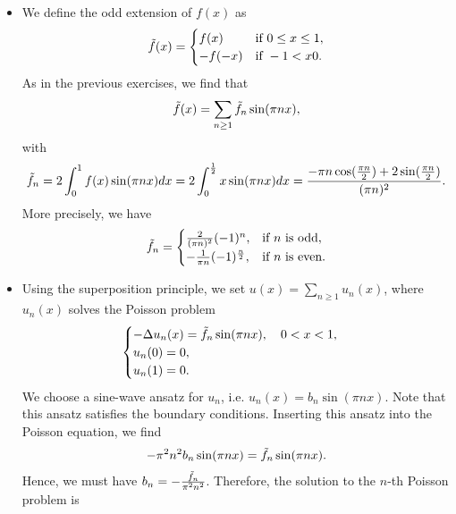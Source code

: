 \documentclass[11pt]{article}
\begin{document}
\begin{solution}
\begin{itemize}
    \item We define the odd extension of $f(x)$ as
    \begin{align*}
        \Tilde{f}(x) = \begin{cases}
            f(x) & \text{if } 0 \leq x \leq 1,\\
            -f(-x) & \text{if } -1 < x 0.
        \end{cases}
    \end{align*}
    As in the previous exercises, we find that
    \begin{align*}
        \Tilde{f}(x) = \sum_{n \geq 1} \Tilde{f}_n \sin(\pi n x), 
    \end{align*}
    with
    \begin{align*}
        \Tilde{f}_n = 2 \int_0^1 f(x) \sin(\pi n x) dx = 2 \int_0^{\frac 1 2} x \sin(\pi n x) dx = \frac{- \pi n \cos (\frac{\pi n}{2}) + 2 \sin(\frac{\pi n}{2})}{(\pi n)^2}.
    \end{align*}
    More precisely, we have
    \begin{align*}
        \Tilde{f}_n = \begin{cases}
            \frac{2}{(\pi n)^2} (-1)^n, & \text{if } n \text{ is odd},\\
            -\frac{1}{\pi n}(-1)^{\frac n 2}, & \text{if } n \text{ is even}.
        \end{cases}
    \end{align*}
    \item Using the superposition principle, we set $u(x) = \sum_{n \geq 1} u_n(x)$, where $u_n(x)$ solves the Poisson problem
    \begin{align*}
        \begin{cases}
            - \Delta u_n(x) = \Tilde{f}_n \sin(\pi n x), \quad 0 < x < 1,\\
            u_n(0) = 0,\\
            u_n(1) = 0.
        \end{cases}
    \end{align*}
    We choose a sine-wave ansatz for $u_n$, i.e. $u_n(x) = b_n \sin(\pi n x)$. Note that this ansatz satisfies the boundary conditions.
    Inserting this ansatz into the Poisson equation, we find
    \begin{align*}
        - \pi^2 n^2 b_n \sin(\pi n x) = \Tilde{f}_n \sin(\pi n x).
    \end{align*}
    Hence, we must have $b_n = -\frac{\Tilde{f}_n}{\pi^2 n^2}$. Therefore, the solution to the $n$-th Poisson problem is

\end{itemize}
\end{solution}
\end{document}
